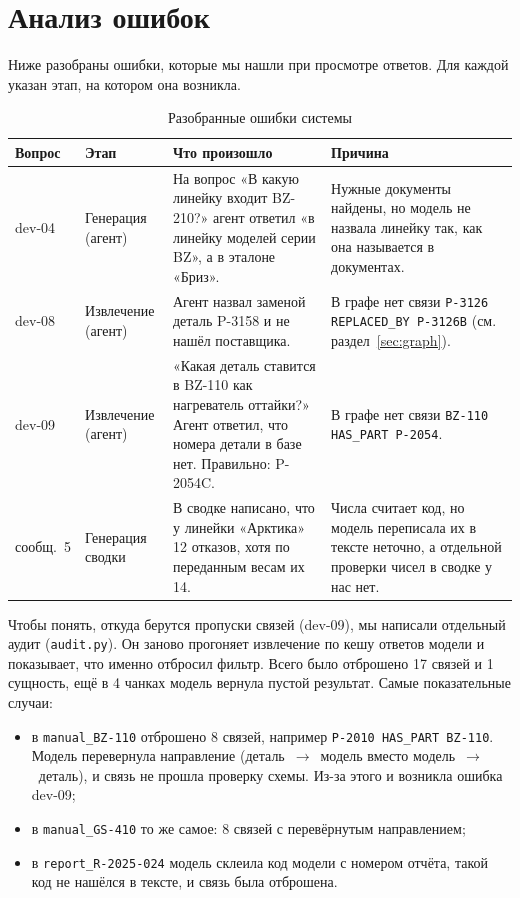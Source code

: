 \documentclass[a4paper,12pt]{article}
\newcommand{\code}[1]{\texttt{#1}}
\begin{document}
\section{Анализ ошибок}\label{sec:errors}

Ниже разобраны ошибки, которые мы нашли при просмотре ответов. Для каждой указан этап, на котором она возникла.

\begin{table}[H]
\centering\footnotesize
\caption{Разобранные ошибки системы}\label{tab:errors}
\begin{tabularx}{\linewidth}{@{}>{\raggedright\arraybackslash}p{1.3cm}>{\raggedright\arraybackslash}p{2.3cm}YY@{}}
\toprule
\textbf{Вопрос} & \textbf{Этап} & \textbf{Что произошло} & \textbf{Причина}\\
\midrule
dev-04 & Генерация (агент) & На вопрос «В какую линейку входит BZ-210?» агент ответил «в линейку моделей серии BZ», а в эталоне «Бриз». & Нужные документы найдены, но модель не назвала линейку так, как она называется в документах.\\
\addlinespace
dev-08 & Извлечение (агент) & Агент назвал заменой деталь P-3158 и не нашёл поставщика. & В графе нет связи \code{P-3126 REPLACED\_BY P-3126B} (см. раздел~\ref{sec:graph}).\\
\addlinespace
dev-09 & Извлечение (агент) & «Какая деталь ставится в BZ-110 как нагреватель оттайки?» Агент ответил, что номера детали в базе нет. Правильно: P-2054C. & В графе нет связи \code{BZ-110 HAS\_PART P-2054}.\\
\addlinespace
сообщ.~5 & Генерация сводки & В сводке написано, что у линейки «Арктика» 12 отказов, хотя по переданным весам их 14. & Числа считает код, но модель переписала их в тексте неточно, а отдельной проверки чисел в сводке у нас нет.\\
\bottomrule
\end{tabularx}
\end{table}

Чтобы понять, откуда берутся пропуски связей (dev-09), мы написали отдельный аудит (\code{audit.py}). Он заново прогоняет извлечение по кешу ответов модели и показывает, что именно отбросил фильтр. Всего было отброшено 17 связей и 1 сущность, ещё в 4 чанках модель вернула пустой результат. Самые показательные случаи:
\begin{itemize}
\item в \code{manual\_BZ-110} отброшено 8 связей, например \code{P-2010 HAS\_PART BZ-110}. Модель перевернула направление (деталь~$\to$~модель вместо модель~$\to$~деталь), и связь не прошла проверку схемы. Из-за этого и возникла ошибка dev-09;
\item в \code{manual\_GS-410} то же самое: 8 связей с перевёрнутым направлением;
\item в \code{report\_R-2025-024} модель склеила код модели с номером отчёта, такой код не нашёлся в тексте, и связь была отброшена.
\end{itemize}
\end{document}
